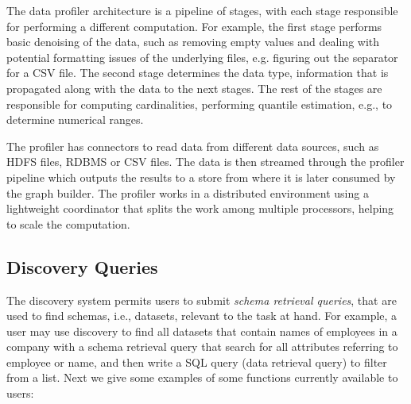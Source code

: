 The data profiler architecture is a pipeline of stages, with each stage
responsible for performing a different computation. For example, the first stage
performs basic denoising of the data, such as removing empty values and dealing
with potential formatting issues of the underlying files, e.g. figuring out the
separator for a CSV file.  The second stage determines the data type,
information that is propagated along with the data to the next stages. The rest
of the stages are responsible for computing cardinalities, performing quantile
estimation, e.g., to determine numerical ranges.

The profiler has connectors to read data from different data sources, such as
HDFS files, RDBMS or CSV files. The data is then streamed through the profiler
pipeline which outputs the results
to a store from where it is later consumed by the graph builder.
The profiler works in a distributed environment using a lightweight coordinator
that splits the work among multiple processors, helping to scale the
computation.



\subsection{Discovery Queries}
\label{subsec:api}

The discovery system permits users to submit \emph{schema retrieval queries},
that are used to find schemas, i.e., datasets, relevant to the task at hand. For
example, a user may use discovery to find all datasets that contain names of
employees in a company with a schema retrieval query that search for all
attributes referring to employee or name, and then write a SQL query (data
retrieval query) to filter from a list. Next we give some examples of some functions
currently available to users:

